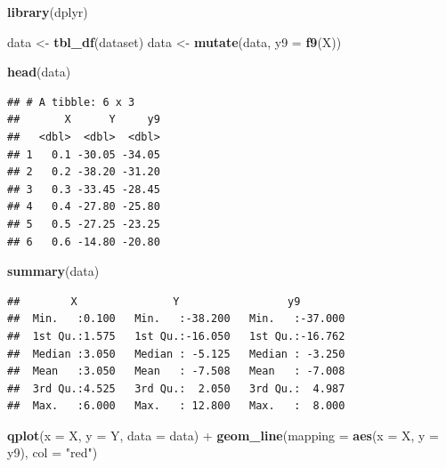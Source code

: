 \documentclass[]{article}
\newenvironment{Shaded}{\begin{snugshade}}{\end{snugshade}}
\newcommand{\KeywordTok}[1]{\textcolor[rgb]{0.13,0.29,0.53}{\textbf{{#1}}}}
\newcommand{\DataTypeTok}[1]{\textcolor[rgb]{0.13,0.29,0.53}{{#1}}}
\newcommand{\StringTok}[1]{\textcolor[rgb]{0.31,0.60,0.02}{{#1}}}
\newcommand{\NormalTok}[1]{{#1}}
\begin{document}
\begin{Shaded}
\begin{Highlighting}[]
\KeywordTok{library}\NormalTok{(dplyr)}

\NormalTok{data <-}\StringTok{ }\KeywordTok{tbl_df}\NormalTok{(dataset)}
\NormalTok{data <-}\StringTok{ }\KeywordTok{mutate}\NormalTok{(data, }\DataTypeTok{y9 =} \KeywordTok{f9}\NormalTok{(X))}
\end{Highlighting}
\end{Shaded}

\begin{Shaded}
\begin{Highlighting}[]
\KeywordTok{head}\NormalTok{(data)}
\end{Highlighting}
\end{Shaded}

\begin{verbatim}
## # A tibble: 6 x 3
##       X      Y     y9
##   <dbl>  <dbl>  <dbl>
## 1   0.1 -30.05 -34.05
## 2   0.2 -38.20 -31.20
## 3   0.3 -33.45 -28.45
## 4   0.4 -27.80 -25.80
## 5   0.5 -27.25 -23.25
## 6   0.6 -14.80 -20.80
\end{verbatim}

\begin{Shaded}
\begin{Highlighting}[]
\KeywordTok{summary}\NormalTok{(data)}
\end{Highlighting}
\end{Shaded}

\begin{verbatim}
##        X               Y                 y9         
##  Min.   :0.100   Min.   :-38.200   Min.   :-37.000  
##  1st Qu.:1.575   1st Qu.:-16.050   1st Qu.:-16.762  
##  Median :3.050   Median : -5.125   Median : -3.250  
##  Mean   :3.050   Mean   : -7.508   Mean   : -7.008  
##  3rd Qu.:4.525   3rd Qu.:  2.050   3rd Qu.:  4.987  
##  Max.   :6.000   Max.   : 12.800   Max.   :  8.000
\end{verbatim}

\begin{Shaded}
\begin{Highlighting}[]
\KeywordTok{qplot}\NormalTok{(}\DataTypeTok{x =} \NormalTok{X, }\DataTypeTok{y =} \NormalTok{Y, }\DataTypeTok{data =} \NormalTok{data)  +}\StringTok{ }\KeywordTok{geom_line}\NormalTok{(}\DataTypeTok{mapping =} \KeywordTok{aes}\NormalTok{(}\DataTypeTok{x =} \NormalTok{X, }\DataTypeTok{y =} \NormalTok{y9), }\DataTypeTok{col =} \StringTok{"red"}\NormalTok{) }
\end{Highlighting}
\end{Shaded}
\end{document}
